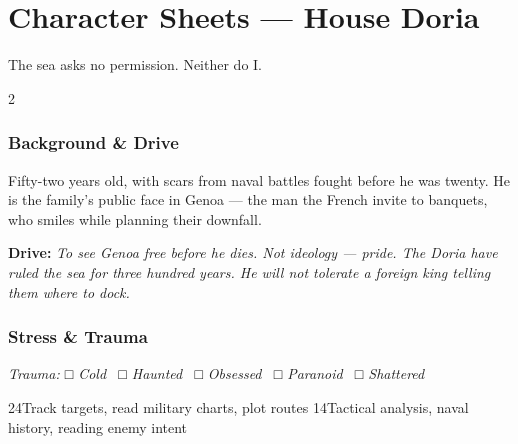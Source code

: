 
\chapter{Character Sheets --- House Doria}
\label{ch:pc-doria}


%
  {The sea asks no permission. Neither do I.}

\begin{multicols}{2}
\subsection*{Background \& Drive}
Fifty-two years old, with scars from naval battles fought before he was
twenty. He is the family's public face in Genoa --- the man the French
invite to banquets, who smiles while planning their downfall.

\textbf{\textcolor{DoriaBlue}{Drive:}} \textit{To see Genoa free before
he dies. Not ideology --- pride. The Doria have ruled the sea for
three hundred years. He will not tolerate a foreign king telling them
where to dock.}
\columnbreak
\subsection*{Stress \& Trauma}
\textit{\small Trauma: □ Cold \ □ Haunted \ □ Obsessed \ □ Paranoid \ □ Shattered}
\end{multicols}

  {2}{4}{Track targets, read military charts, plot routes}
 {1}{4}{Tactical analysis, naval history, reading enemy intent}

